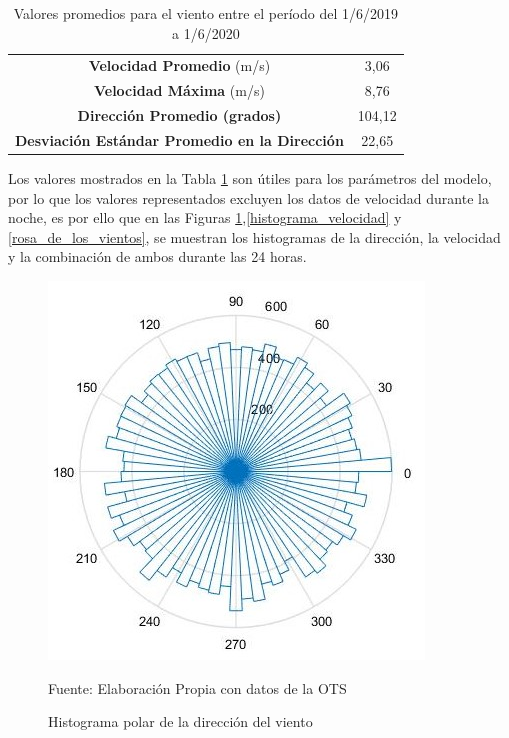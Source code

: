 \begin{table}[H]
\centering
\caption{Valores promedios para el viento entre el período del 1/6/2019 a 1/6/2020}
\label{viento_met}
\begin{tabularx}{10cm}{c c}
\toprule
\textbf{Velocidad Promedio} (\si{\meter/\second}) & 3,06\\ 
\textbf{Velocidad Máxima} (\si{\meter/\second}) & 8,76\\
\hline
\textbf{Dirección Promedio (grados)} & 104,12 \\
\hline
\textbf{Desviación Estándar Promedio en la Dirección} & {22,65}  \\
\bottomrule
\end{tabularx}
\end{table}

Los valores mostrados en la Tabla \ref{viento_met} son útiles para los parámetros del modelo, por lo que los valores representados excluyen los datos de velocidad durante la noche, es por ello que en las Figuras \ref{histograma_direccion},\ref{histograma_velocidad} y \ref{rosa_de_los_vientos}, se muestran los histogramas de la dirección, la velocidad y la combinación de ambos durante las 24 horas.

\begin{figure}[H]
\centering
\includegraphics[scale=0.9]{Figuras/histograma_direccion.jpg}
\caption{Histograma polar de la dirección del viento}
Fuente: Elaboración Propia con datos de la OTS
\label{histograma_direccion}
\end{figure}

